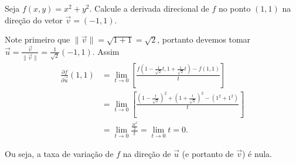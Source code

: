 \begin{example}
    Seja \(f(x,y) = x^2 + y^2\). Calcule a derivada direcional de \(f\) no ponto \((1,1)\) na direção do vetor \(\overrightarrow{v} = (-1,1)\).

    Note primeiro que \(\|\overrightarrow{v}\| = \sqrt{1 + 1} = \sqrt{2}\), portanto devemos tomar \(\overrightarrow{u} = \frac{\overrightarrow{v}}{\|\overrightarrow{v}\|} = \frac{1}{\sqrt{2}}(-1,1)\). Assim
        \begin{align*}
            \frac{\partial f}{\partial\overrightarrow{u}}(1,1)
                & = \lim_{t\to 0}\left[ \frac{f(1 - \frac{1}{\sqrt{2}}t,1 + \frac{1}{\sqrt{2}}t) - f(1,1)}{t} \right] \\
                & = \lim_{t\to 0} \left[ \frac{\left( 1 - \frac{t}{\sqrt{2}} \right)^2 + \left( 1 + \frac{t}{\sqrt{2}} \right)^2 - (1^2 + 1^2)}{t} \right] \\
                & = \lim_{t\to 0} \frac{\frac{2t^2}{2}}{t} = \lim_{t\to 0} t = 0.
        \end{align*}

    Ou seja, a taxa de variação de \(f\) na direção de \(\overrightarrow{u}\) (e portanto de \(\overrightarrow{v}\)) é nula.
\end{example}

